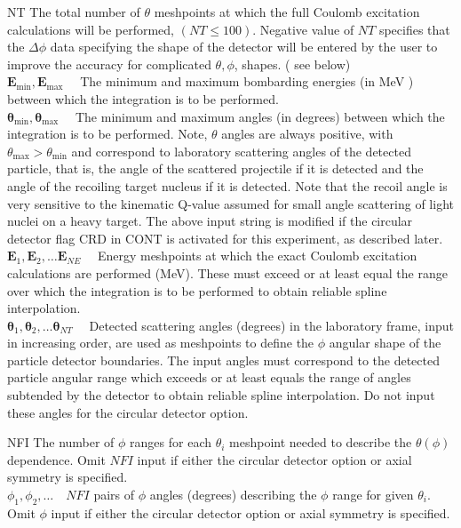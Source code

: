 \documentclass[10pt]{article}
\begin{document}
NT The total number of $\theta$ meshpoints at which the full Coulomb excitation calculations will be performed, $(N T \leq 100)$. Negative value of $N T$ specifies that the $\Delta \phi$ data specifying the shape of the detector will be entered by the user to improve the accuracy for complicated $\theta, \phi$, shapes. ( see below)\\
$\mathbf{E}_{\min }, \mathbf{E}_{\max } \quad$ The minimum and maximum bombarding energies (in MeV ) between which the integration is to be performed.\\
$\boldsymbol{\theta}_{\min }, \boldsymbol{\theta}_{\max } \quad$ The minimum and maximum angles (in degrees) between which the integration is to be performed. Note, $\theta$ angles are always positive, with $\theta_{\max }>\theta_{\min }$ and correspond to laboratory scattering angles of the detected particle, that is, the angle of the scattered projectile if it is detected and the angle of the recoiling target nucleus if it is detected. Note that the recoil angle is very sensitive to the kinematic Q-value assumed for small angle scattering of light nuclei on a heavy target. The above input string is modified if the circular detector flag CRD in CONT is activated for this experiment, as described later.\\
$\mathbf{E}_{1}, \mathbf{E}_{2}, \ldots \mathbf{E}_{N E} \quad$ Energy meshpoints at which the exact Coulomb excitation calculations are performed (MeV). These must exceed or at least equal the range over which the integration is to be performed to obtain reliable spline interpolation.\\
$\boldsymbol{\theta}_{1}, \boldsymbol{\theta}_{2}, \ldots \boldsymbol{\theta}_{N T} \quad$ Detected scattering angles (degrees) in the laboratory frame, input in increasing order, are used as meshpoints to define the $\phi$ angular shape of the particle detector boundaries. The input angles must correspond to the detected particle angular range which exceeds or at least equals the range of angles subtended by the detector to obtain reliable spline interpolation. Do not input these angles for the circular detector option.

NFI The number of $\phi$ ranges for each $\theta_{i}$ meshpoint needed to describe the $\theta(\phi)$ dependence. Omit $N F I$ input if either the circular detector option or axial symmetry is specified.\\
$\phi_{1}, \phi_{2}, \ldots \quad N F I$ pairs of $\phi$ angles (degrees) describing the $\phi$ range for given $\theta_{i}$. Omit $\phi$ input if either the circular detector option or axial symmetry is specified.
\end{document}
